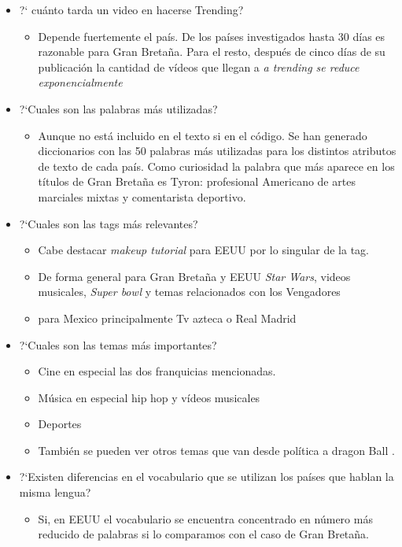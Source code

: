\documentclass[a4paper,12pt]{article}
\begin{document}
\begin{itemize}
\item ?` cu\'anto tarda un video en hacerse Trending?
\begin{itemize}
\item Depende fuertemente el pa\'is. De los pa\'ises investigados hasta 30 d\'ias es razonable para Gran Breta\~na. Para el resto, despu\'es de cinco d\'ias de su publicaci\'on la cantidad de v\'ideos que llegan a {\itshape a trending se reduce exponencialmente}
\end{itemize}
\item ?`Cuales son las palabras m\'as utilizadas?
\begin{itemize}
\item Aunque no est\'a incluido en el texto si en el c\'odigo. Se han generado diccionarios con las 50 palabras m\'as utilizadas para los distintos atributos de texto de cada pa\'is. Como curiosidad la palabra que m\'as aparece en los t\'itulos de Gran Breta\~na es Tyron: profesional Americano de artes marciales mixtas y comentarista deportivo.
\end{itemize}
\item ?`Cuales son las tags m\'as relevantes?
\begin{itemize}
\item Cabe destacar {\itshape makeup tutorial} para EEUU por lo singular de la tag.
\item De forma general para Gran Breta\~na y EEUU {\itshape Star Wars}, videos musicales, {\itshape Super bowl} y temas relacionados con los Vengadores
\item para Mexico principalmente Tv azteca o Real Madrid  
\end{itemize}
\item ?`Cuales son las temas m\'as importantes?
\begin{itemize}
\item Cine en especial las dos franquicias mencionadas.
\item M\'usica en especial hip hop y v\'ideos musicales
\item Deportes
\item Tambi\'en se pueden ver otros temas que van desde pol\'itica a dragon Ball .
\end{itemize}
\item ?`Existen diferencias en el vocabulario que se utilizan los pa\'ises que hablan la misma lengua?
\begin{itemize}
\item Si, en EEUU el vocabulario se encuentra concentrado en n\'umero m\'as reducido de palabras si lo comparamos con el caso de Gran Breta\~na.
\end{itemize}


\end{itemize}
\end{document}
